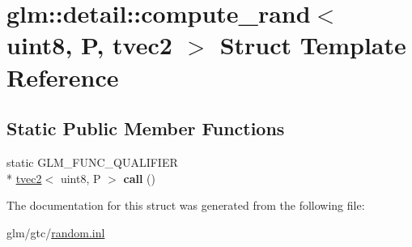 \hypertarget{structglm_1_1detail_1_1compute__rand_3_01uint8_00_01P_00_01tvec2_01_4}{\section{glm\-:\-:detail\-:\-:compute\-\_\-rand$<$ uint8, P, tvec2 $>$ Struct Template Reference}
\label{structglm_1_1detail_1_1compute__rand_3_01uint8_00_01P_00_01tvec2_01_4}
}
\subsection*{Static Public Member Functions}
\begin{DoxyCompactItemize}
\item 
\hypertarget{structglm_1_1detail_1_1compute__rand_3_01uint8_00_01P_00_01tvec2_01_4_aa2d8c5aa8c17ad7e38dfbf9460bde2f5}{static G\-L\-M\-\_\-\-F\-U\-N\-C\-\_\-\-Q\-U\-A\-L\-I\-F\-I\-E\-R \\*
\hyperlink{structglm_1_1tvec2}{tvec2}$<$ uint8, P $>$ {\bfseries call} ()}\label{structglm_1_1detail_1_1compute__rand_3_01uint8_00_01P_00_01tvec2_01_4_aa2d8c5aa8c17ad7e38dfbf9460bde2f5}

\end{DoxyCompactItemize}


The documentation for this struct was generated from the following file\-:\begin{DoxyCompactItemize}
\item 
glm/gtc/\hyperlink{random_8inl}{random.\-inl}\end{DoxyCompactItemize}
